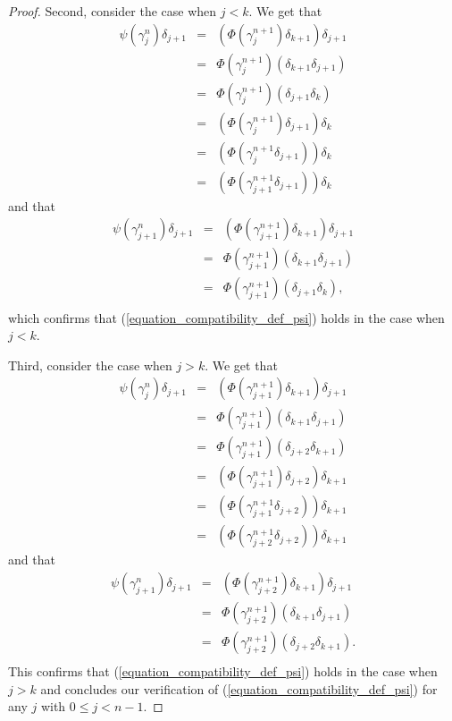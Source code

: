 \begin{proof}
Second, consider the case when $j<k$. We get that
\begin{displaymath}
\begin{array}{rcl}
\psi (\gamma ^n_j)\delta _{j+1} & = & (\Phi (\gamma ^{n+1}_j)\delta _{k+1})\delta _{j+1} \\
& = & \Phi (\gamma ^{n+1}_j)(\delta _{k+1}\delta _{j+1}) \\
& = & \Phi (\gamma ^{n+1}_j)(\delta _{j+1}\delta _k) \\
& = & (\Phi (\gamma ^{n+1}_j)\delta _{j+1})\delta _k \\
& = & (\Phi (\gamma ^{n+1}_j\delta _{j+1}))\delta _k \\
& = & (\Phi (\gamma ^{n+1}_{j+1}\delta _{j+1}))\delta _k
\end{array}
\end{displaymath}
and that
\begin{displaymath}
\begin{array}{rcl}
\psi (\gamma ^n_{j+1})\delta _{j+1} & = & (\Phi (\gamma ^{n+1}_{j+1})\delta _{k+1})\delta _{j+1} \\
& = & \Phi (\gamma ^{n+1}_{j+1})(\delta _{k+1} \delta _{j+1}) \\
& = & \Phi (\gamma ^{n+1}_{j+1})(\delta _{j+1}\delta _k), \\
\end{array}
\end{displaymath}
which confirms that (\ref{equation_compatibility_def_psi}) holds in the case when $j<k$.

Third, consider the case when $j>k$. We get that
\begin{displaymath}
\begin{array}{rcl}
\psi (\gamma ^n_j)\delta _{j+1} & = & (\Phi (\gamma ^{n+1}_{j+1})\delta _{k+1})\delta _{j+1} \\
& = & \Phi (\gamma ^{n+1}_{j+1})(\delta _{k+1}\delta _{j+1}) \\
& = & \Phi (\gamma ^{n+1}_{j+1})(\delta _{j+2}\delta _{k+1}) \\
& = & (\Phi (\gamma ^{n+1}_{j+1})\delta _{j+2})\delta _{k+1} \\
& = & (\Phi (\gamma ^{n+1}_{j+1}\delta _{j+2}))\delta _{k+1} \\
& = & (\Phi (\gamma ^{n+1}_{j+2}\delta _{j+2}))\delta _{k+1}
\end{array}
\end{displaymath}
and that
\begin{displaymath}
\begin{array}{rcl}
\psi (\gamma ^n_{j+1})\delta _{j+1} & = & (\Phi (\gamma ^{n+1}_{j+2})\delta _{k+1})\delta _{j+1} \\
& = & \Phi (\gamma ^{n+1}_{j+2})(\delta _{k+1} \delta _{j+1}) \\
& = & \Phi (\gamma ^{n+1}_{j+2})(\delta _{j+2}\delta _{k+1}). \\
\end{array}
\end{displaymath}
This confirms that (\ref{equation_compatibility_def_psi}) holds in the case when $j>k$ and concludes our verification of (\ref{equation_compatibility_def_psi}) for any $j$ with $0\leq j<n-1$.


\end{proof}
